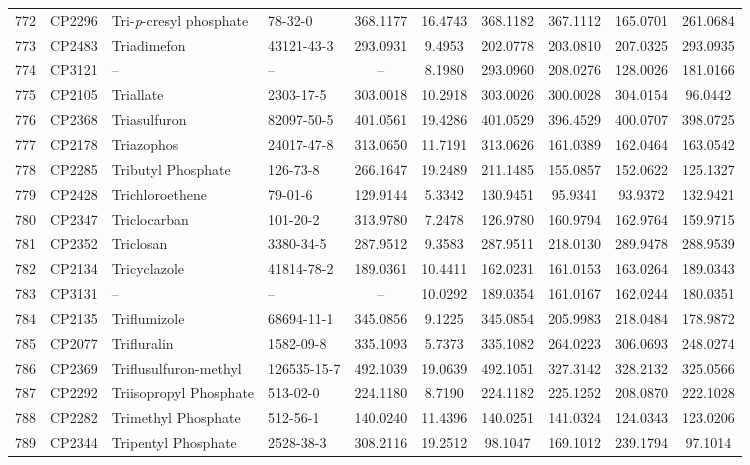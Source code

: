 \begin{longtable}{clllcccccc}
772 & CP2296 & Tri-\textit{p}-cresyl phosphate & 78-32-0 & 368.1177 & 16.4743 & 368.1182 & 367.1112 & 165.0701 & 261.0684 \\ 
773 & CP2483 & Triadimefon & 43121-43-3 & 293.0931 & 9.4953 & 202.0778 & 203.0810 & 207.0325 & 293.0935 \\ 
774 & CP3121 & – & – & – & 8.1980 & 293.0960 & 208.0276 & 128.0026 & 181.0166 \\ 
775 & CP2105 & Triallate & 2303-17-5 & 303.0018 & 10.2918 & 303.0026 & 300.0028 & 304.0154 & 96.0442 \\ 
776 & CP2368 & Triasulfuron & 82097-50-5 & 401.0561 & 19.4286 & 401.0529 & 396.4529 & 400.0707 & 398.0725 \\ 
777 & CP2178 & Triazophos & 24017-47-8 & 313.0650 & 11.7191 & 313.0626 & 161.0389 & 162.0464 & 163.0542 \\ 
778 & CP2285 & Tributyl Phosphate & 126-73-8 & 266.1647 & 19.2489 & 211.1485 & 155.0857 & 152.0622 & 125.1327 \\ 
779 & CP2428 & Trichloroethene & 79-01-6 & 129.9144 & 5.3342 & 130.9451 & 95.9341 & 93.9372 & 132.9421 \\ 
780 & CP2347 & Triclocarban & 101-20-2 & 313.9780 & 7.2478 & 126.9780 & 160.9794 & 162.9764 & 159.9715 \\ 
781 & CP2352 & Triclosan & 3380-34-5 & 287.9512 & 9.3583 & 287.9511 & 218.0130 & 289.9478 & 288.9539 \\ 
782 & CP2134 & Tricyclazole & 41814-78-2 & 189.0361 & 10.4411 & 162.0231 & 161.0153 & 163.0264 & 189.0343 \\ 
783 & CP3131 & – & – & – & 10.0292 & 189.0354 & 161.0167 & 162.0244 & 180.0351 \\ 
784 & CP2135 & Triflumizole & 68694-11-1 & 345.0856 & 9.1225 & 345.0854 & 205.9983 & 218.0484 & 178.9872 \\ 
785 & CP2077 & Trifluralin & 1582-09-8 & 335.1093 & 5.7373 & 335.1082 & 264.0223 & 306.0693 & 248.0274 \\ 
786 & CP2369 & Triflusulfuron-methyl & 126535-15-7 & 492.1039 & 19.0639 & 492.1051 & 327.3142 & 328.2132 & 325.0566 \\ 
787 & CP2292 & Triisopropyl Phosphate & 513-02-0 & 224.1180 & 8.7190 & 224.1182 & 225.1252 & 208.0870 & 222.1028 \\ 
788 & CP2282 & Trimethyl Phosphate & 512-56-1 & 140.0240 & 11.4396 & 140.0251 & 141.0324 & 124.0343 & 123.0206 \\ 
789 & CP2344 & Tripentyl Phosphate & 2528-38-3 & 308.2116 & 19.2512 & 98.1047 & 169.1012 & 239.1794 & 97.1014 \\ 

\end{longtable}
